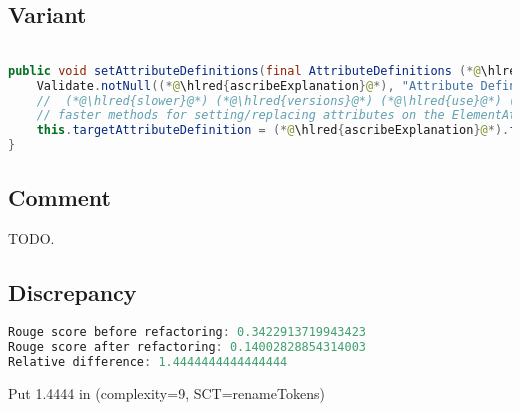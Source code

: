 \documentclass[11pt]{article}
\DeclareRobustCommand{\hlred}[1]{{\sethlcolor{YellowOrange}\hl{#1}}}
\begin{document}
  \subsection{Variant}

  \begin{lstlisting}[language=java]

public void setAttributeDefinitions(final AttributeDefinitions (*@\hlred{ascribeExplanation}@*)) {
    Validate.notNull((*@\hlred{ascribeExplanation}@*), "Attribute Definitions cannot be null");
    //  (*@\hlred{slower}@*) (*@\hlred{versions}@*) (*@\hlred{use}@*) (*@\hlred{these}@*) (*@\hlred{two}@*) (*@\hlred{versions}@*) (*@\hlred{as}@*) (*@\hlred{opposedto}@*) (*@\hlred{using}@*) (*@\hlred{this}@*) (*@\hlred{class}@*) (*@\hlred{which}@*) (*@\hlred{also}@*) (*@\hlred{defines}@*) (*@\hlred{more}@*)
    // faster methods for setting/replacing attributes on the ElementAttributes implementation
    this.targetAttributeDefinition = (*@\hlred{ascribeExplanation}@*).forName(TEMPLATE_MODE, TARGET_ATTR_NAME);
}
  \end{lstlisting}

  \subsection{Comment}

  TODO.

  \subsection{Discrepancy}

  \begin{lstlisting}[language=java]
Rouge score before refactoring: 0.3422913719943423
Rouge score after refactoring: 0.14002828854314003
Relative difference: 1.4444444444444444
  \end{lstlisting}

  Put 1.4444 in (complexity=9, SCT=renameTokens)
\end{document}
